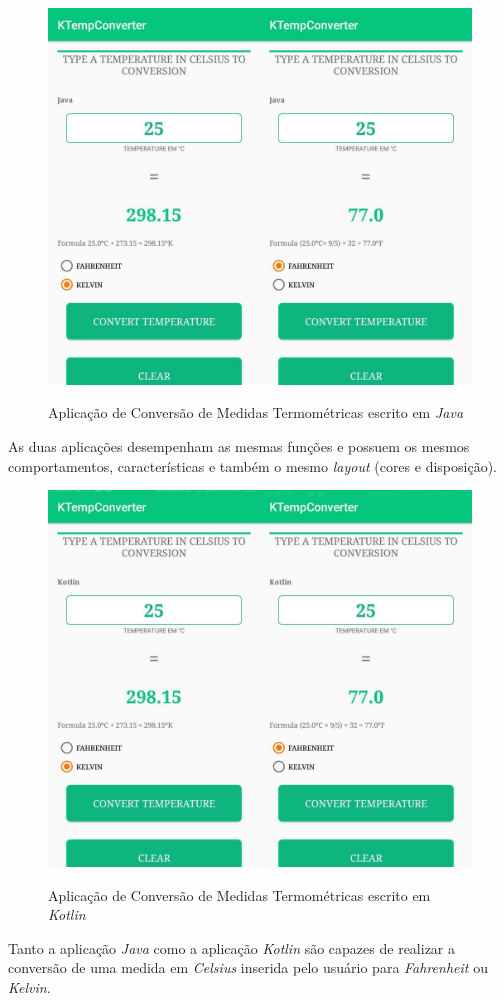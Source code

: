 \FloatBarrier
\begin{figure}[!htbp]
	\centering
		\caption{Aplicação de Conversão de Medidas Termométricas escrito em \textit{Java}}
	\includegraphics[scale=0.3]{imagens/java}
	\label{fig:figura3}
\end{figure}
\FloatBarrier

As duas aplicações desempenham as mesmas funções e possuem os mesmos comportamentos, características e também o mesmo \textit{layout} (cores e disposição).  

\FloatBarrier
\begin{figure}[!htbp]
	\centering
		\caption{Aplicação de Conversão de Medidas Termométricas escrito em \textit{Kotlin}}
	\includegraphics[scale=0.3]{imagens/kotlin}
	\label{fig:figura3}
\end{figure}
\FloatBarrier

Tanto a aplicação \textit{Java} como a aplicação \textit{Kotlin} são capazes de realizar a conversão de uma medida em \textit{Celsius} inserida pelo usuário para \textit{Fahrenheit} ou \textit{Kelvin}.